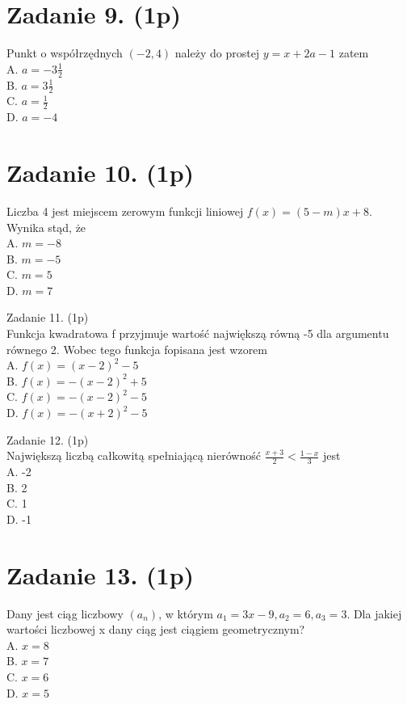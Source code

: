 \documentclass[10pt]{article}
\begin{document}
\section*{Zadanie 9. (1p)}
Punkt o współrzędnych \((-2,4)\) należy do prostej \(y=x+2 a-1\) zatem\\
A. \(a=-3 \frac{1}{2}\)\\
B. \(a=3 \frac{1}{2}\)\\
C. \(a=\frac{1}{2}\)\\
D. \(a=-4\)

\section*{Zadanie 10. (1p)}
Liczba 4 jest miejscem zerowym funkcji liniowej \(f(x)=(5-m) x+8\). Wynika stąd, że\\
A. \(m=-8\)\\
B. \(m=-5\)\\
C. \(m=5\)\\
D. \(m=7\)

Zadanie 11. (1p)\\
Funkcja kwadratowa f przyjmuje wartość największą równą -5 dla argumentu równego 2. Wobec tego funkcja fopisana jest wzorem\\
A. \(f(x)=(x-2)^{2}-5\)\\
B. \(f(x)=-(x-2)^{2}+5\)\\
C. \(f(x)=-(x-2)^{2}-5\)\\
D. \(f(x)=-(x+2)^{2}-5\)

Zadanie 12. (1p)\\
Największą liczbą całkowitą spełniającą nierówność \(\frac{x+3}{2}<\frac{1-x}{3}\) jest\\
A. -2\\
B. 2\\
C. 1\\
D. -1

\section*{Zadanie 13. (1p)}
Dany jest ciąg liczbowy \(\left(a_{n}\right)\), w którym \(a_{1}=3 x-9, a_{2}=6, a_{3}=3\). Dla jakiej wartości liczbowej x dany ciąg jest ciągiem geometrycznym?\\
A. \(x=8\)\\
B. \(x=7\)\\
C. \(x=6\)\\
D. \(x=5\)
\end{document}
